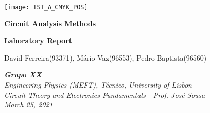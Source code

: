 
\thispagestyle {empty}

\texttt{[image: IST\_A\_CMYK\_POS]}

\begin{center}
%
\vspace{1.0cm}
\begin{center}\Large\textbf{Circuit Analysis Methods}\end{center}
\begin{center}\large\textbf{Laboratory Report}\end{center}

\begin{center} David Ferreira(93371), Mário Vaz(96553), Pedro Baptista(96560)\end{center}

\begin{center} \textit {\textbf{Grupo XX} \\Engineering Physics (MEFT), Técnico, University of Lisbon\\ Circuit Theory and Electronics Fundamentals - \small Prof. José Sousa\\March 25, 2021}\end{center}
%
\end{center}

